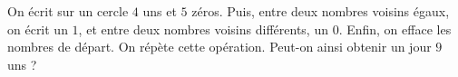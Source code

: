 On écrit sur un cercle $4$ uns et $5$ zéros. Puis, entre deux nombres voisins égaux, on écrit un $1$, et entre deux nombres voisins différents, un $0$. Enfin, on efface les nombres de départ. On répète cette opération. Peut-on ainsi obtenir un jour $9$ uns ?
